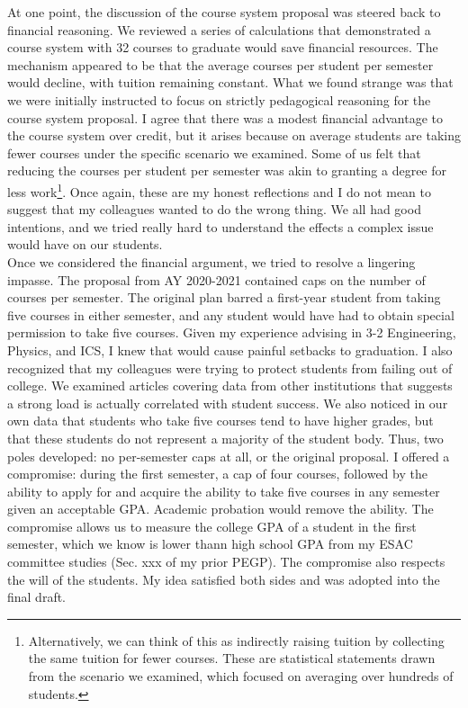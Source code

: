 \documentclass[../../../main.tex]{subfiles}
\begin{document}
At one point, the discussion of the course system proposal was steered back to financial reasoning.  We reviewed a series of calculations that demonstrated a course system with 32 courses to graduate would save financial resources.  The mechanism appeared to be that the average courses per student per semester would decline, with tuition remaining constant.  What we found strange was that we were initially instructed to focus on strictly pedagogical reasoning for the course system proposal.  I agree that there was a modest financial advantage to the course system over credit, but it arises because on average students are taking fewer courses under the specific scenario we examined.  Some of us felt that reducing the courses per student per semester was akin to granting a degree for less work\footnote{Alternatively, we can think of this as indirectly raising tuition by collecting the same tuition for fewer courses.  These are statistical statements drawn from the scenario we examined, which focused on averaging over hundreds of students.}.  Once again, these are my honest reflections and I do not mean to suggest that my colleagues wanted to do the wrong thing.  We all had good intentions, and we tried really hard to understand the effects a complex issue would have on our students.
\\
\vspace{0.25cm}
Once we considered the financial argument, we tried to resolve a lingering impasse.  The proposal from AY 2020-2021 contained caps on the number of courses per semester.  The original plan barred a first-year student from taking five courses in either semester, and any student would have had to obtain special permission to take five courses.  Given my experience advising in 3-2 Engineering, Physics, and ICS, I knew that would cause painful setbacks to graduation.  I also recognized that my colleagues were trying to protect students from failing out of college.  We examined articles covering data from other institutions that suggests a strong load is actually correlated with student success.  We also noticed in our own data that students who take five courses tend to have higher grades, but that these students do not represent a majority of the student body.  Thus, two poles developed: no per-semester caps at all, or the original proposal.  I offered a compromise: during the first semester, a cap of four courses, followed by the ability to apply for and acquire the ability to take five courses in any semester given an acceptable GPA.  Academic probation would remove the ability.  The compromise allows us to measure the college GPA of a student in the first semester, which we know is lower thann high school GPA from my ESAC committee studies (Sec. xxx of my prior PEGP).  The compromise also respects the will of the students.  My idea satisfied both sides and was adopted into the final draft.
\end{document}
